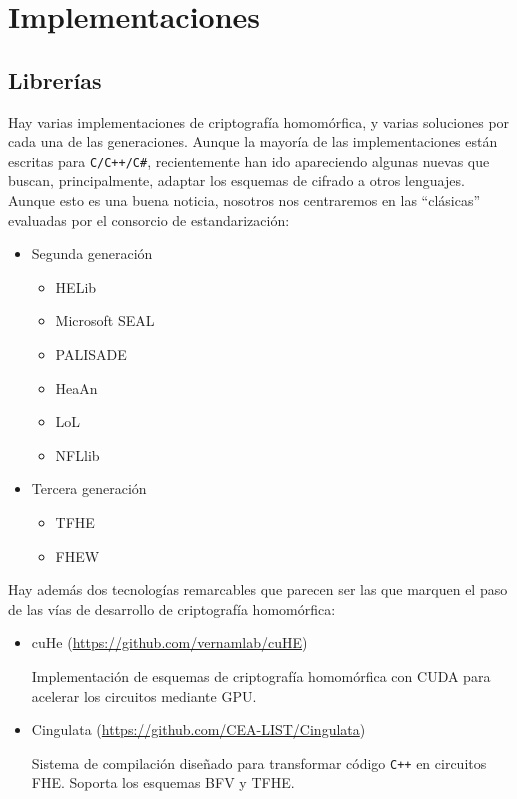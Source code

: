 \chapter{Implementaciones}
\label{chap:libs}

\section{Librerías}

Hay varias implementaciones de criptografía homomórfica, y varias soluciones por cada una de las generaciones. Aunque la mayoría de las implementaciones están escritas para \verb|C/C++/C#|, recientemente han ido apareciendo algunas nuevas que buscan, principalmente, adaptar los esquemas de cifrado a otros lenguajes. Aunque esto es una buena noticia, nosotros nos centraremos en las ``clásicas'' evaluadas por el consorcio de estandarización:

\begin{itemize}
    \item Segunda generación
    \begin{itemize}
        \item HELib
        \item Microsoft SEAL
        \item PALISADE
        \item HeaAn
        \item LoL
        \item NFLlib
    \end{itemize}
    \item Tercera generación
    \begin{itemize}
        \item TFHE
        \item FHEW
    \end{itemize}
\end{itemize}

Hay además dos tecnologías remarcables que parecen ser las que marquen el paso de las vías de desarrollo de criptografía homomórfica:

\begin{itemize}
    \item cuHe (\url{https://github.com/vernamlab/cuHE})

    Implementación de esquemas de criptografía homomórfica con CUDA para acelerar los circuitos mediante GPU.

    \item Cingulata (\url{https://github.com/CEA-LIST/Cingulata})

    Sistema de compilación diseñado para transformar código \verb|C++| en circuitos FHE. Soporta los esquemas BFV y TFHE.

\end{itemize}

